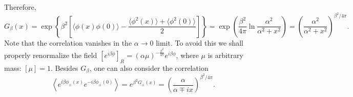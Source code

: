 \documentclass[aps,prb,superscriptaddress,nofootinbib]{revtex4}
\begin{document}
Therefore,
\begin{equation}
	G_\beta(x) = \exp\left\{\beta^2\left[\langle\phi(x)\phi(0)\rangle-\frac{\langle\phi^2(x)\rangle+\langle\phi^2(0)\rangle}{2}\right]\right\}
	= \exp\left(\frac{\beta^2}{4\pi}\ln\frac{\alpha^2}{\alpha^2+x^2}\right)
	= \left(\frac{\alpha^2}{\alpha^2+x^2}\right)^{\beta^2/4\pi}.
\end{equation} 
Note that the correlation vanishes in the $\alpha \rightarrow 0$ limit.
To avoid this we shall properly renormalize the field $\left[e^{i\beta \phi}\right]_R = (\alpha\mu)^{-\frac{\beta^2}{4\pi}} e^{i\beta\phi}$, where $\mu$ is arbitrary mass: $[\mu]=1$.
Besides $G_\beta$, one can also consider the correlation
\begin{equation*}
	\left\langle e^{i\beta\phi_\pm(x)} e^{-i\beta\phi_\pm(0)} \right\rangle
	= e^{\beta^2 G_\pm(x)} = \left(\frac{\alpha}{\alpha\mp ix}\right)^{\beta^2/4\pi}.
\end{equation*}




\end{document}
